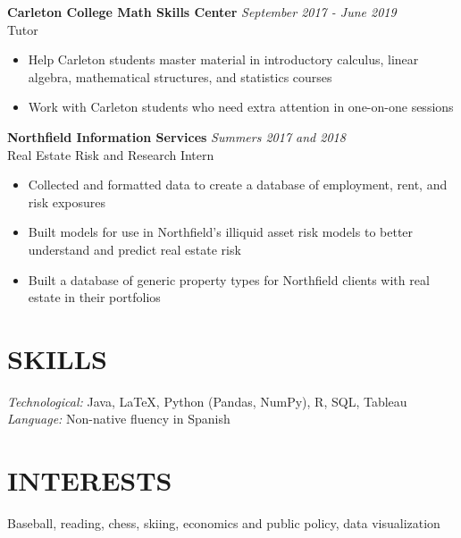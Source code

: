 \documentclass[margin, 9pt]{res} %
\begin{document}
\begin{resume}
{\sl} \textbf{Carleton College Math Skills Center} \hfill \textit{September 2017 - June 2019}\\
{\sl} Tutor \smallskip
{\sl} \begin{itemize}
\item Help Carleton students master material in introductory calculus, linear algebra, mathematical structures, and statistics courses
\item Work with Carleton students who need extra attention in one-on-one sessions
\end{itemize}

{\sl} \textbf{Northfield Information Services} \hfill \textit{Summers 2017 and 2018}\\
{\sl} Real Estate Risk and Research Intern \smallskip
{\sl} \begin{itemize}
\item Collected and formatted data to create a database of employment, rent, and risk exposures
\item Built models for use in Northfield's illiquid asset risk models to better understand and predict real estate risk
\item Built a database of generic property types for Northfield clients with real estate in their portfolios
\end{itemize}


\section{SKILLS}
{\sl Technological:} Java, LaTeX, Python (Pandas, NumPy), R, SQL, Tableau\\ \smallskip
{\sl Language:} Non-native fluency in Spanish

\section{INTERESTS}
{\sl} Baseball, reading, chess, skiing, economics and public policy, data visualization

\end{resume}
\end{document}
